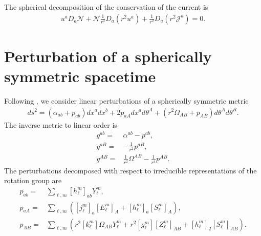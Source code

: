 \documentclass[12pt]{report}
\begin{document}
The spherical decomposition of the conservation of the current is
\begin{align}
    u^aD_a\mathcal{N}
    +
    \mathcal{N}\frac{1}{r^2}D_a\left(r^2 u^a\right)
    +
    \frac{1}{r^2}D_a\left(r^2\mathcal{J}^a\right)
    =
    0
    .
\end{align}

\section{Perturbation of a spherically symmetric spacetime
\label{sec:pert_spherically_symmetric_spacetime}}

Following \cite{Martel:2005ir}, we consider linear perturbations of
a spherically symmetric metric
\begin{align}
    ds^2 
    =
    \left(\alpha_{ab} + p_{ab}\right)dx^adx^b
    +
    2 p_{aA}dx^ad\theta^A
    +
    \left(
        r^2
        \Omega_{AB}
        +
        p_{AB}
    \right)
    d\theta^Ad\theta^B
    .
\end{align}
The inverse metric to linear order is
\begin{subequations}
\begin{align}
    g^{ab}
    =&
    \alpha^{ab}
    -
    p^{ab}
    ,\\
    g^{aB}
    =&
    -
    \frac{1}{r^2}p^{aB}
    ,\\
    g^{AB}
    =&
    \frac{1}{r^2}\Omega^{AB}
    -
    \frac{1}{r^4}p^{AB}
    .
\end{align}
\end{subequations}
The perturbations decomposed with respect to irreducible representations
of the rotation group are
\begin{subequations}
\begin{align}
    p_{ab}
    =&
    \sum_{\ell,m} \left[h^m_{\ell}\right]_{ab} Y^m_{\ell}
    ,\\
    p_{aA}
    =&
    \sum_{\ell,m} \left(
        \left[j^m_{\ell}\right]_a \left[E^m_{\ell}\right]_A 
        +
        \left[h^m_{\ell}\right]_a \left[S^m_{\ell}\right]_A
    \right)
    ,\\
    p_{AB}
    =&
    \sum_{\ell,m} \left(
        r^2\left[k^m_{\ell}\right]\Omega_{AB} Y^m_{\ell}
        +
        r^2\left[g^m_{\ell}\right]\left[Z^m_{\ell}\right]_{AB}
        +
        \left[h^m_{\ell}\right]_2 \left[S^m_{\ell}\right]_{AB}
    \right)
    .
\end{align}
\end{subequations}
\end{document}
